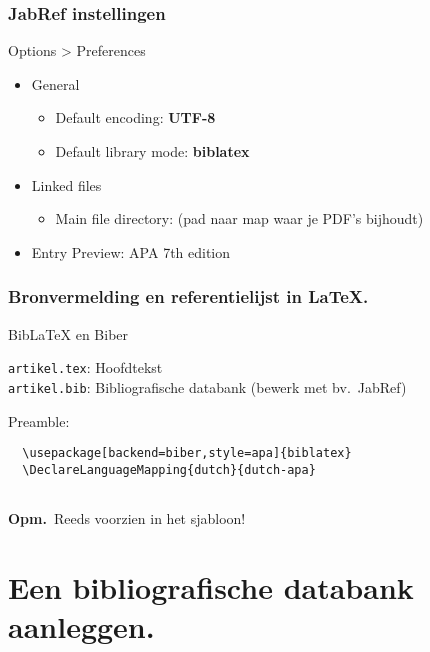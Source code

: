 \documentclass[aspectratio=169]{beamer}
\begin{document}
\begin{frame}
  \frametitle{JabRef instellingen}

  Options > Preferences

  \begin{itemize}
    \item General
    \begin{itemize}
      \item Default encoding: \textbf{UTF-8}
      \item Default library mode: \textbf{biblatex}
    \end{itemize}
    \item Linked files
    \begin{itemize}
      \item Main file directory: (pad naar map waar je PDF's bijhoudt)
    \end{itemize}
  \item Entry Preview: APA 7th edition
  \end{itemize}

\end{frame}

\begin{frame}[fragile]
  \frametitle{Bronvermelding en referentielijst in {\LaTeX}.}

  Bib{\LaTeX} en Biber

  \bigskip

  \verb|artikel.tex|: Hoofdtekst\\
  \verb|artikel.bib|: Bibliografische databank (bewerk met bv.~JabRef)

  \bigskip

  Preamble:

  \begin{verbatim}
  \usepackage[backend=biber,style=apa]{biblatex}
  \DeclareLanguageMapping{dutch}{dutch-apa}
  
  \end{verbatim}

  \textbf{Opm.}\ Reeds voorzien in het sjabloon!

\end{frame}

\section{Een bibliografische databank aanleggen.}
\end{document}
